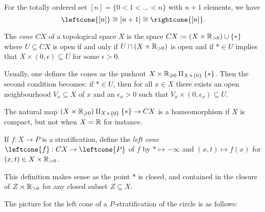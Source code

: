 \begin{exmp}
For the totally ordered set \([n]=\{0<1<\ldots<n\}\) with \(n+1\) elements, we have  
\[ \leftcone{[n]} \cong [n+1] \cong \rightcone{[n]}\text{.} \]
\end{exmp}

\begin{defn}
The \emph{cone} \(CX\) of a topological space \(X\) is the space \(CX\coloneq (X\times\mathbb{R}_{>0})\cup\{*\}\) where \(U\subseteq CX\) is open if and only if \(U\cap(X\times\mathbb{R}_{>0})\) is open and if \(*\in U\) implies that \(X\times(0,\epsilon)\subseteq U\) for some \(\epsilon>0\).
\end{defn}

\begin{rmk}
Usually, one defines the cones as the pushout \(X\times\bb R_{\geq 0}\pushout{X\times\{0\}}\{*\}\).
Then the second condition becomes: if \(*\in U\), then for all \(x\in X\) there exists an open neighbourhood \(V_x\subseteq X\) of \(x\) and an \(\epsilon_x>0\) such that \(V_x\times(0,\epsilon_x)\subseteq U\).

The natural map \((X\times\bb R_{\geq 0})\pushout{X\times\{0\}}\{*\}\to CX\) is a homeomorphism if \(X\) is compact, but not when \(X=\mathbb{R}\) for instance.
\end{rmk}

\begin{defn}
If \(f\colon X\to P\) is a stratification, define the \emph{left cone} \(\leftcone{f}\colon CX\to\leftcone{P}\) of \(f\) by \(*\mapsto-\infty\) and \((x,t)\mapsto f(x)\) for \((x,t)\in X\times\mathbb{R}_{>0}\).
\end{defn}

This definition makes sense as the point \(*\) is closed, and contained in the closure of \(Z\times\mathbb{R}_{>0}\) for any closed subset \(Z\subseteq X\).

The picture for the left cone of a \(P\)-stratification of the circle is as follows:
\begin{center}
\end{center}

